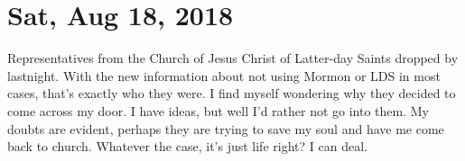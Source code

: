 \section{Sat, Aug 18, 2018}

Representatives from the Church of Jesus Christ of Latter-day Saints dropped by
lastnight. With the new information about not using Mormon or LDS in most cases,
that's exactly who they were. I find myself wondering why they decided to come across
my door. I have ideas, but well I'd rather not go into them. My doubts are evident,
perhaps they are trying to save my soul and have me come back to church. Whatever the
case, it's just life right? I can deal.
